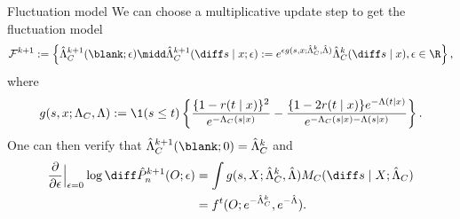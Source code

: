 \documentclass[handout]{beamer}\usepackage{listings}
\begin{document}
\begin{frame}[label={sec:org51b8d19}]{Fluctuation model}
We can choose a multiplicative update step to get the fluctuation model
\begin{equation*}
  \mathcal{F}^{k+1}:=
  \left\{
    \hat{\Lambda}_C^{k+1}(\blank;\epsilon) \midd 
    \hat{\Lambda}_C^{k+1}(\diff s \mid x ; \epsilon) :=  e^{\epsilon g(s, x ;
      \hat{\Lambda}_C^k, \hat{\Lambda} )}  \hat{\Lambda}_C^{k}( \diff s \mid x ),
    \epsilon \in \R
  \right\},
\end{equation*}
where
\begin{equation*}
  g(s, x ; \Lambda_C, \Lambda) :=
  \1(s \leq t)\left\{
    \frac{\{1-r(t \mid x)\}^2}{e^{-\Lambda_C(s \mid x)}}
    - \frac{\{1-2r(t \mid x)\} e^{-\Lambda(t \mid x)}} {e^{-\Lambda_C(s \mid x) - \Lambda(s \mid x)}}
  \right\}.
\end{equation*}
\pause One can then verify that $\hat{\Lambda}_C^{k+1}(\blank;0) = \hat{\Lambda}_C^{k}$ and 
\begin{align*}
  \frac{\partial }{\partial \epsilon} \Big\vert_{\epsilon=0}\log\diff \hat{P}_n^{k+1}(O; \epsilon)
  & = \int g(s, X; \hat{\Lambda}_C^k, \hat{\Lambda})  M_C(\diff s \mid X; \hat{\Lambda}_C)
  \\ & = f^t(O; e^{-\hat{\Lambda}_C^k}, e^{-\hat{\Lambda}}).
\end{align*}
\end{frame}
\end{document}
